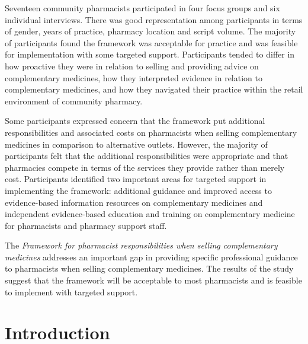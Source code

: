 \documentclass[12pt,]{article}
\begin{document}
Seventeen community pharmacists participated in four focus groups and
six individual interviews. There was good representation among
participants in terms of gender, years of practice, pharmacy location
and script volume. The majority of participants found the framework was
acceptable for practice and was feasible for implementation with some
targeted support. Participants tended to differ in how proactive they
were in relation to selling and providing advice on complementary
medicines, how they interpreted evidence in relation to complementary
medicines, and how they navigated their practice within the retail
environment of community pharmacy.

Some participants expressed concern that the framework put additional
responsibilities and associated costs on pharmacists when selling
complementary medicines in comparison to alternative outlets. However,
the majority of participants felt that the additional responsibilities
were appropriate and that pharmacies compete in terms of the services
they provide rather than merely cost. Participants identified two
important areas for targeted support in implementing the framework:
additional guidance and improved access to evidence-based information
resources on complementary medicines and independent evidence-based
education and training on complementary medicine for pharmacists and
pharmacy support staff.

The \emph{Framework for pharmacist responsibilities when selling
complementary medicines} addresses an important gap in providing
specific professional guidance to pharmacists when selling complementary
medicines. The results of the study suggest that the framework will be
acceptable to most pharmacists and is feasible to implement with
targeted support.

\newpage 

\tableofcontents

\newpage

\newpage

\section{Introduction}\label{introduction}
\end{document}
